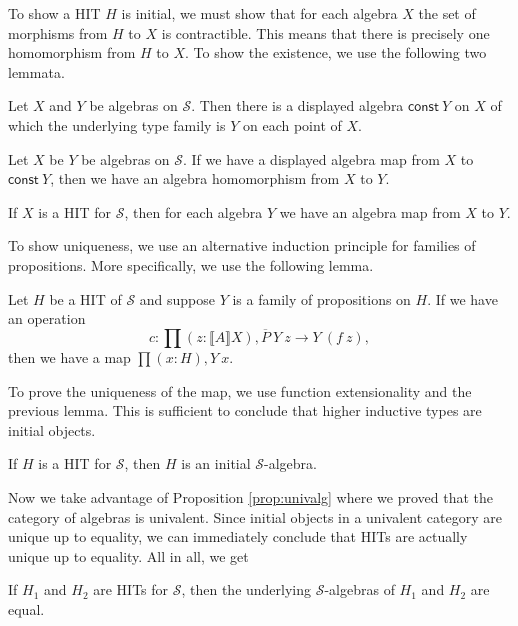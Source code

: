 \documentclass[9pt]{entcs}
\newcommand{\function}[1]{\mathsf{#1}}
\newcommand{\deprod}[3]{\prod(#1 : #2), #3} %
\newcommand{\0}{\textbf{0}} %
\newcommand{\sig}{\mathcal{S}} %
\newcommand{\semP}[1]{\llbracket #1 \rrbracket} %
\newcommand{\polydact}[2]{\overline{#1} \> #2} %
\newcommand{\constdisp}{\function{const}} %
\begin{document}
To show a HIT $H$ is initial, we must show that for each algebra $X$ the set of morphisms from $H$ to $X$ is contractible.
This means that there is precisely one homomorphism from $H$ to $X$.
To show the existence, we use the following two lemmata.

\begin{lemma}
Let $X$ and $Y$ be algebras on $\sig$.
Then there is a displayed algebra $\constdisp \> Y$ on $X$ of which the underlying type family is $Y$ on each point of $X$.
\end{lemma}

\begin{lemma}
Let $X$ be $Y$ be algebras on $\sig$.
If we have a displayed algebra map from $X$ to $\constdisp \> Y$, then we have an algebra homomorphism from $X$ to $Y$.
\end{lemma}

\begin{corollary}
If $X$ is a HIT for $\sig$, then for each algebra $Y$ we have an algebra map from $X$ to $Y$.
\end{corollary}

To show uniqueness, we use an alternative induction principle for families of propositions.
More specifically, we use the following lemma.

\begin{lemma}
Let $H$ be a HIT of $\sig$ and suppose $Y$ is a family of propositions on $H$.
If we have an operation
\[
c : \deprod{z}{\semP{A}{X}}{\polydact{P}{Y} \> z \rightarrow Y \> (f \> z)},
\]
then we have a map $\deprod{x}{H}{Y \> x}$.
\end{lemma}

To prove the uniqueness of the map, we use function extensionality and the previous lemma.
This is sufficient to conclude that higher inductive types are initial objects.

\begin{proposition}
If $H$ is a HIT for $\sig$, then $H$ is an initial $\sig$-algebra.
\end{proposition}

Now we take advantage of Proposition \ref{prop:univalg} where we proved that the category of algebras is univalent.
Since initial objects in a univalent category are unique up to equality, we can immediately conclude that HITs are actually unique up to equality.
All in all, we get

\begin{corollary}
\label{cor:hit_unique}
If $H_1$ and $H_2$ are HITs for $\sig$, then the underlying $\sig$-algebras of $H_1$ and $H_2$ are equal.
\end{corollary}
\end{document}
